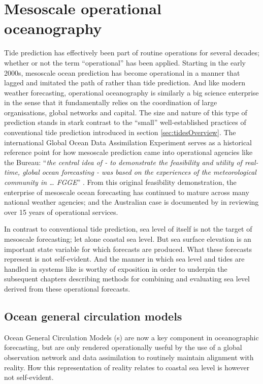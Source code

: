\section{Mesoscale operational oceanography}
\label{sec:mesoscaleOperational}
Tide prediction has effectively been part of routine operations for several decades; whether or not the term ``operational'' has been applied.
Starting in the early 2000s, mesoscale ocean prediction has become operational in a manner that lagged and imitated the path of \NWP \citep{Harper:kb} rather than tide prediction. 
And like modern weather forecasting, operational oceanography is similarly a big science enterprise \citep{Petersen:2012tr} in the sense that it fundamentally relies on the coordination of large organisations, global networks and capital. 
The size and nature of this type of prediction stands in stark contrast to the ``small'' well-established practices of conventional tide prediction introduced in section \ref{sec:tidesOverview}.
The international Global Ocean Data Assimilation Experiment \GODAE{} serves as a historical reference point for how mesoscale prediction came into operational agencies like the Bureau:
``\textit{the central idea of \GODAE{} - to demonstrate the feasibility and utility of real-time, global ocean forecasting - was based on the experiences of the meteorological community in \dots{} FGGE}'' \citep{Bell:2009uv}.
From this original feasibility demonstration, the enterprise of mesoscale ocean forecasting has continued to mature across many national weather agencies; and the Australian case is documented by \citep{10.1080/1755876x.2019.1685834} in reviewing over 15 years of operational services.


In contrast to conventional tide prediction, sea level of itself is not the target of mesoscale forecasting; let alone coastal sea level.   But sea surface elevation is an important state variable for which forecasts are produced.  What these forecasts represent is not self-evident. And the manner in which sea level and tides are handled in systems like \BL{} is worthy of exposition in order to underpin the subsequent chapters describing methods for combining and evaluating sea level derived from these operational forecasts. 
  
\subsection{Ocean general circulation models}
Ocean General Circulation Models (\OGCM{}s) are now a key component in oceanographic forecasting, but are only rendered operationally useful by the use of a global observation network and data assimilation to routinely maintain alignment with reality.
How this representation of reality relates to coastal sea level is however not self-evident.




